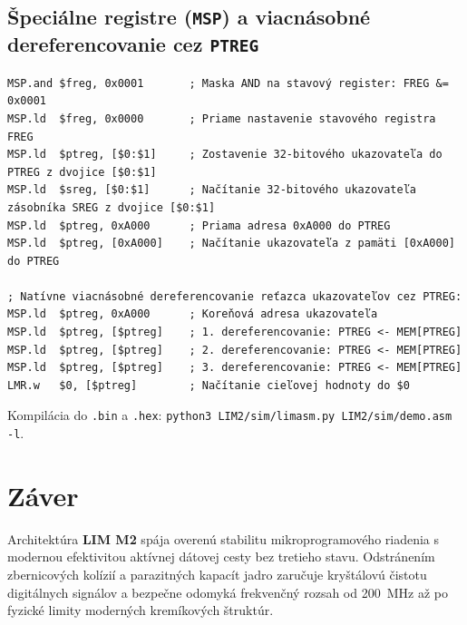 \documentclass[11pt,a4paper]{article}
\begin{document}
\subsection{Špeciálne registre (\texttt{MSP}) a viacnásobné dereferencovanie cez \texttt{PTREG}}
\begin{verbatim}
MSP.and $freg, 0x0001       ; Maska AND na stavový register: FREG &= 0x0001
MSP.ld  $freg, 0x0000       ; Priame nastavenie stavového registra FREG
MSP.ld  $ptreg, [$0:$1]     ; Zostavenie 32-bitového ukazovateľa do PTREG z dvojice [$0:$1]
MSP.ld  $sreg, [$0:$1]      ; Načítanie 32-bitového ukazovateľa zásobníka SREG z dvojice [$0:$1]
MSP.ld  $ptreg, 0xA000      ; Priama adresa 0xA000 do PTREG
MSP.ld  $ptreg, [0xA000]    ; Načítanie ukazovateľa z pamäti [0xA000] do PTREG

; Natívne viacnásobné dereferencovanie reťazca ukazovateľov cez PTREG:
MSP.ld  $ptreg, 0xA000      ; Koreňová adresa ukazovateľa
MSP.ld  $ptreg, [$ptreg]    ; 1. dereferencovanie: PTREG <- MEM[PTREG]
MSP.ld  $ptreg, [$ptreg]    ; 2. dereferencovanie: PTREG <- MEM[PTREG]
MSP.ld  $ptreg, [$ptreg]    ; 3. dereferencovanie: PTREG <- MEM[PTREG]
LMR.w   $0, [$ptreg]        ; Načítanie cieľovej hodnoty do $0
\end{verbatim}
Kompilácia do \texttt{.bin} a \texttt{.hex}: \texttt{python3 LIM2/sim/limasm.py LIM2/sim/demo.asm -l}.

\section{Záver}
Architektúra \textbf{LIM M2} spája overenú stabilitu mikroprogramového riadenia s modernou efektivitou aktívnej dátovej cesty bez tretieho stavu. Odstránením zbernicových kolízií a parazitných kapacít jadro zaručuje kryštálovú čistotu digitálnych signálov a bezpečne odomyká frekvenčný rozsah od 200~MHz až po fyzické limity moderných kremíkových štruktúr.
\end{document}
